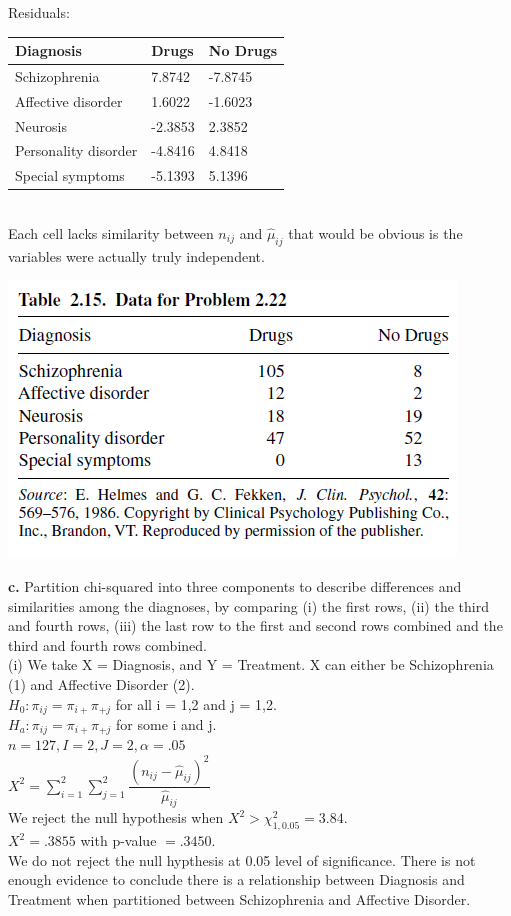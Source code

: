 \documentclass[paper=letter, fontsize=11pt]{scrartcl} %
\begin{document}
Residuals:
\begin{tabular}{|l|l|l|}
\hline
Diagnosis            & Drugs   & No Drugs \\ \hline
Schizophrenia        & 7.8742  & -7.8745  \\ \hline
Affective disorder   & 1.6022  & -1.6023  \\ \hline
Neurosis             & -2.3853 & 2.3852   \\ \hline
Personality disorder & -4.8416 & 4.8418   \\ \hline
Special symptoms     & -5.1393 & 5.1396   \\ \hline
\end{tabular}
\\

Each cell lacks similarity between $n_{ij}$ and $\hat{\mu}_{ij}$ that would be obvious
is the variables were actually truly independent. \\

\begin{center}
	\includegraphics[scale=.75]{table215.png}
\end{center}

\textbf{c.} Partition chi-squared into three components to describe differences and
similarities among the diagnoses, by comparing (i) the first rows, (ii) the third and
fourth rows, (iii) the last row to the first and second rows combined and the third
and fourth rows combined. \\

(i)
We take X = Diagnosis, and Y = Treatment. X can either be Schizophrenia (1) and Affective
Disorder (2). \\
$H_0: \pi_{ij} = \pi_{i+}\pi_{+j}$ for all i = 1,2 and j = 1,2. \\
$H_a: \pi_{ij} = \pi_{i+}\pi_{+j}$ for some i and j. \\
$n = 127, I = 2, J = 2, \alpha = .05$ \\ 
$X^2 = \sum_{i=1}^{2}\sum_{j=1}^{2} \dfrac{(n_{ij}-\hat{\mu}_{ij})^2}{\hat{\mu}_{ij}}$ \\
We reject the null hypothesis when $X^2 > \chi_{1,0.05}^2 = 3.84$. \\
$X^2 = .3855$ with p-value $= .3450$. \\
We do not reject the null hypthesis at 0.05 level of significance. There is not enough evidence to conclude there is a relationship between Diagnosis and Treatment when partitioned between Schizophrenia and Affective Disorder. \\
\end{document}
